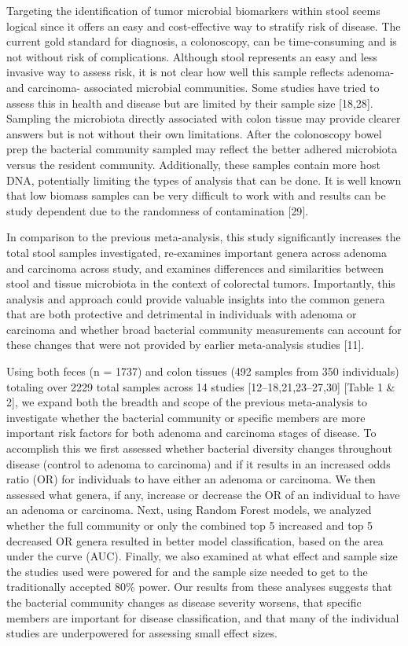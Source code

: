 \documentclass[12pt,]{article}
\begin{document}
Targeting the identification of tumor microbial biomarkers within stool
seems logical since it offers an easy and cost-effective way to stratify
risk of disease. The current gold standard for diagnosis, a colonoscopy,
can be time-consuming and is not without risk of complications. Although
stool represents an easy and less invasive way to assess risk, it is not
clear how well this sample reflects adenoma- and carcinoma- associated
microbial communities. Some studies have tried to assess this in health
and disease but are limited by their sample size {[}18,28{]}. Sampling
the microbiota directly associated with colon tissue may provide clearer
answers but is not without their own limitations. After the colonoscopy
bowel prep the bacterial community sampled may reflect the better
adhered microbiota versus the resident community. Additionally, these
samples contain more host DNA, potentially limiting the types of
analysis that can be done. It is well known that low biomass samples can
be very difficult to work with and results can be study dependent due to
the randomness of contamination {[}29{]}.

In comparison to the previous meta-analysis, this study significantly
increases the total stool samples investigated, re-examines important
genera across adenoma and carcinoma across study, and examines
differences and similarities between stool and tissue microbiota in the
context of colorectal tumors. Importantly, this analysis and approach
could provide valuable insights into the common genera that are both
protective and detrimental in individuals with adenoma or carcinoma and
whether broad bacterial community measurements can account for these
changes that were not provided by earlier meta-analysis studies
{[}11{]}.

Using both feces (n = 1737) and colon tissues (492 samples from 350
individuals) totaling over 2229 total samples across 14 studies
{[}12--18,21,23--27,30{]} {[}Table 1 \& 2{]}, we expand both the breadth
and scope of the previous meta-analysis to investigate whether the
bacterial community or specific members are more important risk factors
for both adenoma and carcinoma stages of disease. To accomplish this we
first assessed whether bacterial diversity changes throughout disease
(control to adenoma to carcinoma) and if it results in an increased odds
ratio (OR) for individuals to have either an adenoma or carcinoma. We
then assessed what genera, if any, increase or decrease the OR of an
individual to have an adenoma or carcinoma. Next, using Random Forest
models, we analyzed whether the full community or only the combined top
5 increased and top 5 decreased OR genera resulted in better model
classification, based on the area under the curve (AUC). Finally, we
also examined at what effect and sample size the studies used were
powered for and the sample size needed to get to the traditionally
accepted 80\% power. Our results from these analyses suggests that the
bacterial community changes as disease severity worsens, that specific
members are important for disease classification, and that many of the
individual studies are underpowered for assessing small effect sizes.
\end{document}
